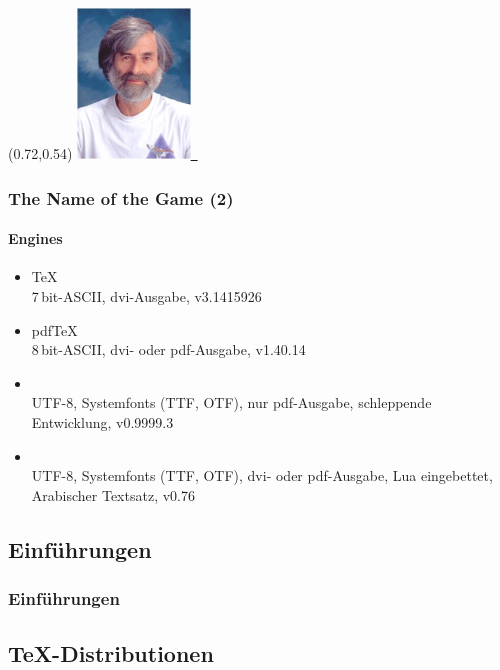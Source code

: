 \documentclass[t,ngerman,compress]{beamer}
\begin{document}
\begin{frame}
\begin{textblock}{3}
{      %
    }
  \end{textblock}
  \begin{textblock}{3}(0.72,0.54)
    \href{https://en.wikipedia.org/wiki/File:Leslie_Lamport.jpg}{%
      \includegraphics[width=3cm]{leslie-lamport}~%
    }
  \end{textblock}
\end{frame}

\begin{frame}
  \frametitle{The Name of the Game (2)}
  \framesubtitle{Engines}
  \begin{itemize}
  \item \TeX\\
    7\,bit-ASCII, dvi-Ausgabe, v3.1415926
  \item pdf\TeX\\
    8\,bit-ASCII, dvi- oder pdf-Ausgabe, v1.40.14
  \item {}\\
    UTF-8, Systemfonts (TTF, OTF), nur pdf-Ausgabe, schleppende
    Entwicklung, v0.9999.3
  \item {}\\
    UTF-8, Systemfonts (TTF, OTF), dvi- oder pdf-Ausgabe, Lua
    eingebettet, Arabischer Textsatz, v0.76
  \end{itemize}
\end{frame}

\subsection{Einf\"uhrungen}

\begin{frame}
  \frametitle{Einführungen}
  \nocite{*}
  \begingroup
  \printbibliography[heading=none,keyword=intro]
  \endgroup
\end{frame}

\subsection{\TeX-Distributionen}
\end{document}
